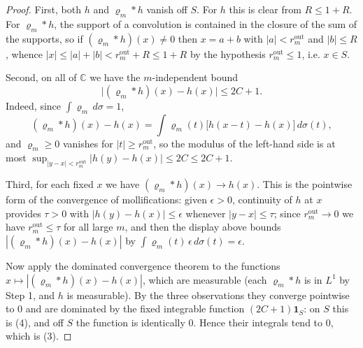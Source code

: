 \begin{proof}
First, both $h$ and $\varrho_m*h$ vanish off $S$.  For $h$ this is clear from
$R\le1+R$.  For $\varrho_m*h$, the support of a convolution is contained in
the closure of the sum of the supports, so if $(\varrho_m*h)(x)\ne0$ then
$x=a+b$ with $|a|<r_m^{\mathrm{out}}$ and $|b|\le R$, whence
$|x|\le|a|+|b|<r_m^{\mathrm{out}}+R\le1+R$ by the hypothesis
$r_m^{\mathrm{out}}\le1$, i.e. $x\in S$.

Second, on all of $\mathbb{C}$ we have the $m$-independent bound
\begin{equation}\tag{4}
  \bigl|(\varrho_m*h)(x)-h(x)\bigr|\le2C+1 .
\end{equation}
Indeed, since $\int\varrho_m\,d\sigma=1$,
\[
  (\varrho_m*h)(x)-h(x)=\int\varrho_m(t)\bigl[h(x-t)-h(x)\bigr]\,d\sigma(t),
\]
and $\varrho_m\ge0$ vanishes for $|t|\ge r_m^{\mathrm{out}}$, so the modulus
of the left-hand side is at most
$\sup_{|y-x|<r_m^{\mathrm{out}}}|h(y)-h(x)|\le2C\le2C+1$.

Third, for each fixed $x$ we have $(\varrho_m*h)(x)\to h(x)$.  This is the
pointwise form of the convergence of mollifications: given $\epsilon>0$,
continuity of $h$ at $x$ provides $\tau>0$ with $|h(y)-h(x)|\le\epsilon$
whenever $|y-x|\le\tau$; since $r_m^{\mathrm{out}}\to0$ we have
$r_m^{\mathrm{out}}\le\tau$ for all large $m$, and then the display above
bounds $|(\varrho_m*h)(x)-h(x)|$ by
$\int\varrho_m(t)\,\epsilon\,d\sigma(t)=\epsilon$.

Now apply the dominated convergence theorem to the functions
$x\mapsto|(\varrho_m*h)(x)-h(x)|$, which are measurable (each
$\varrho_m*h$ is in $L^{1}$ by Step 1, and $h$ is measurable).  By the three
observations they converge pointwise to $0$ and are dominated by the fixed
integrable function $(2C+1)\mathbf1_S$: on $S$ this is (4), and off $S$ the
function is identically $0$.  Hence their integrals tend to $0$, which is (3).


\end{proof}
